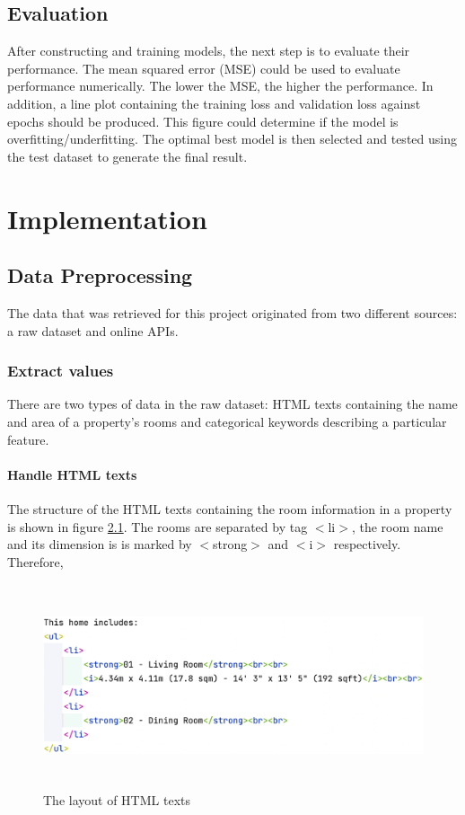 \documentclass[12pt,twoside]{report}
\begin{document}
\section{Evaluation}
After constructing and training models, the next step is to evaluate their performance. The mean squared error (MSE) could be used to evaluate performance numerically. The lower the MSE, the higher the performance. In addition, a line plot containing the training loss and validation loss against epochs should be produced. This figure could determine if the model is overfitting/underfitting. The optimal best model is then selected and tested using the test dataset to generate the final result. 

\chapter{Implementation}
\section{Data Preprocessing}
The data that was retrieved for this project originated from two different sources: a raw dataset and online APIs. 

\subsection{Extract values}
There are two types of data in the raw dataset: HTML texts containing the name and area of a property's rooms and categorical keywords describing a particular feature.

\subsubsection{Handle HTML texts}
The structure of the HTML texts containing the room information in a property is shown in figure \ref{html_structure}. The rooms are separated by tag $<$li$>$, the room name and its dimension is is marked by $<$strong$>$ and $<$i$>$ respectively. Therefore, 
\begin{figure}[h]
	\includegraphics[width=15cm, height=6cm]{html_structure}
	\caption{The layout of HTML texts}
	\label{html_structure}
	\centering
\end{figure}
\end{document}
